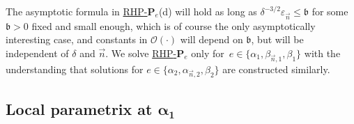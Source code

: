 \documentclass[pdftex]{sigma}
\numberwithin{equation}{section}
\newcommand{\n}{{\vec n}}
\newcommand{\rhp} {\textnormal{RHP}-${\boldsymbol P}$}
\begin{document}
The asymptotic formula in \hyperref[rhp]{\rhp$_e$}(d) will hold as long as $ \delta^{-3/2}\varepsilon_\n \leq \mathfrak b $ for some $ {\mathfrak b>0 }$ fixed and small enough, which is of course the only asymptotically interesting case, and constants in $ \boldsymbol{\mathcal O}(\cdot) $ will depend on $ \mathfrak b $, but will be independent of $ \delta $ and $ \n $. We solve \hyperref[rhp]{\rhp$_e$} only for~$ e\in\{\alpha_1,\beta_{\n,1},\beta_1\} $ with the understanding that solutions for $ e\in \{ \alpha_2,\alpha_{\n,2},\beta_2 \} $ are constructed similarly.


\subsection[Local parametrix at alpha\_1]{Local parametrix at $ \boldsymbol{\alpha_1 }$}
\end{document}

